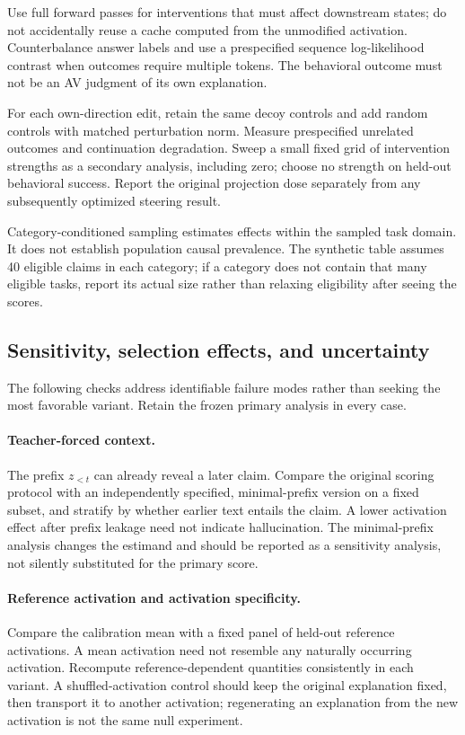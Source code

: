 Use full forward passes for interventions that must affect downstream states;
do not accidentally reuse a cache computed from the unmodified activation.
Counterbalance answer labels and use a prespecified sequence log-likelihood
contrast when outcomes require multiple tokens. The behavioral outcome must
not be an AV judgment of its own explanation.

For each own-direction edit, retain the same decoy controls and add random
controls with matched perturbation norm. Measure prespecified unrelated
outcomes and continuation degradation. Sweep a small fixed grid of intervention
strengths as a secondary analysis, including zero; choose no strength on
held-out behavioral success. Report the original projection dose separately
from any subsequently optimized steering result.

Category-conditioned sampling estimates effects within the sampled task
domain. It does not establish population causal prevalence. The synthetic
table assumes 40 eligible claims in each category; if a category does not
contain that many eligible tasks, report its actual size rather than relaxing
eligibility after seeing the scores.

\subsection{Sensitivity, selection effects, and uncertainty}

The following checks address identifiable failure modes rather than seeking
the most favorable variant. Retain the frozen primary analysis in every case.

\paragraph{Teacher-forced context.}
The prefix $z_{<t}$ can already reveal a later claim. Compare the original
scoring protocol with an independently specified, minimal-prefix version on
a fixed subset, and stratify by whether earlier text entails the claim. A
lower activation effect after prefix leakage need not indicate hallucination.
The minimal-prefix analysis changes the estimand and should be reported as
a sensitivity analysis, not silently substituted for the primary score.

\paragraph{Reference activation and activation specificity.}
Compare the calibration mean with a fixed panel of held-out reference
activations. A mean activation need not resemble any naturally occurring
activation. Recompute reference-dependent quantities consistently in each
variant. A shuffled-activation control should keep the original explanation
fixed, then transport it to another activation; regenerating an explanation
from the new activation is not the same null experiment.

